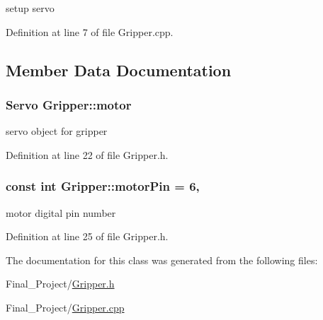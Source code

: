 setup servo 



Definition at line 7 of file Gripper.\-cpp.



\subsection{Member Data Documentation}
\hypertarget{classGripper_ad72d0ae4ccd2be00ec3f303e7a0c1cc9}{
\subsubsection[{motor}]{\setlength{\rightskip}{0pt plus 5cm}Servo Gripper\-::motor\hspace{0.3cm}{\ttfamily [private]}}}\label{classGripper_ad72d0ae4ccd2be00ec3f303e7a0c1cc9}


servo object for gripper 



Definition at line 22 of file Gripper.\-h.

\hypertarget{classGripper_ae12467d04d155401f1c6ba694b295f40}{
\subsubsection[{motor\-Pin}]{\setlength{\rightskip}{0pt plus 5cm}const int Gripper\-::motor\-Pin = 6\hspace{0.3cm}{\ttfamily [static]}, {\ttfamily [private]}}}\label{classGripper_ae12467d04d155401f1c6ba694b295f40}


motor digital pin number 



Definition at line 25 of file Gripper.\-h.



The documentation for this class was generated from the following files\-:\begin{DoxyCompactItemize}
\item 
Final\-\_\-\-Project/\hyperlink{Gripper_8h}{Gripper.\-h}\item 
Final\-\_\-\-Project/\hyperlink{Gripper_8cpp}{Gripper.\-cpp}\end{DoxyCompactItemize}
